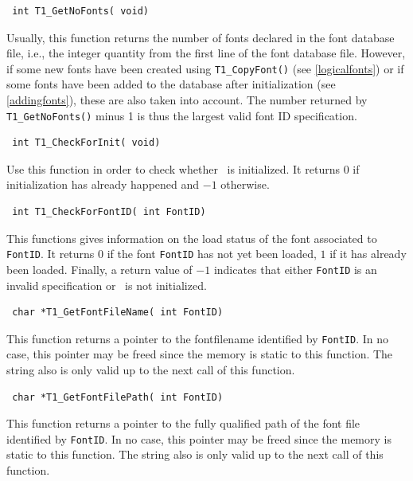 \precorr
\begin{verbatim}
 int T1_GetNoFonts( void)
\end{verbatim}\postcorr
Usually, this function returns the number of fonts declared in the font
database file, i.e., the integer quantity from the first line of the font
database file. However, if some new fonts have been created using
\verb+T1_CopyFont()+ (see \ref{logicalfonts}) or if some fonts have
been added to the database 
after initialization (see \ref{addingfonts}), these are also taken into
account. The number returned by \verb+T1_GetNoFonts()+ minus 1
is thus the largest valid font ID specification.

\precorr
\begin{verbatim}
 int T1_CheckForInit( void)
\end{verbatim}\postcorr
Use this function in order to check whether \tonelib\ is initialized. It
returns $0$ if initialization has already happened and $-1$ otherwise.

\precorr
\begin{verbatim}
 int T1_CheckForFontID( int FontID)
\end{verbatim}\postcorr
This functions gives information on the load status of the font associated to
\verb+FontID+. It returns $0$ if the font \verb+FontID+ has not yet been loaded,
$1$ if it has already been loaded. Finally, a return value of $-1$ indicates
that either \verb+FontID+ is an invalid specification or \tonelib\ is not
initialized. 


\precorr
\begin{verbatim}
 char *T1_GetFontFileName( int FontID)
\end{verbatim}\postcorr
This function returns a pointer to the fontfilename identified by
\verb+FontID+. In no case, this pointer may be freed since the memory is
static to this function. The string also is only valid up to the next call of
this function.

\precorr
\begin{verbatim}
 char *T1_GetFontFilePath( int FontID)
\end{verbatim}\postcorr
This function returns a pointer to the fully qualified path of the font file
identified by \verb+FontID+. In no case, this pointer may be freed since the
memory is static to this function. The string also is only valid up to the
next call of this function.

